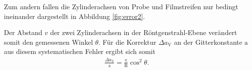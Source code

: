 
Zum andern fallen die Zylinderachsen von Probe und Filmstreifen
nur bedingt ineinander dargestellt in Abbildung \ref{fig:error2}.

Der Abstand $v$ der zwei Zylinderachsen in der Röntgenstrahl-Ebene
verändert somit den gemessenen Winkel $\theta$.
Für die Korrektur $\Delta a_{\mathrm{V}}$ an der Gitterkonstante $\mathrm{a}$
aus diesem systematischen Fehler ergibt sich somit
\begin{align}
  \frac{\Delta a_{\mathrm{V}}}{\mathrm{a}}=\frac{\mathrm{v}}{\mathrm{R}} \cos^2 \theta. \label{eqn:sys2}
\end{align}
